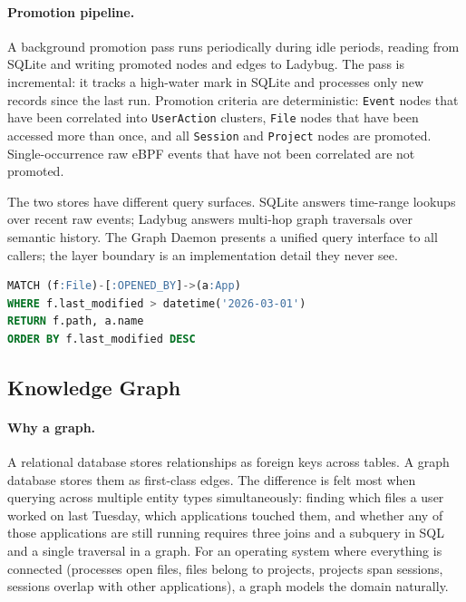 \paragraph{Promotion pipeline.}
A background promotion pass runs periodically during idle periods, reading
from SQLite and writing promoted nodes and edges to Ladybug. The pass is
incremental: it tracks a high-water mark in SQLite and processes only new
records since the last run. Promotion criteria are deterministic: \texttt{Event}
nodes that have been correlated into \texttt{UserAction} clusters, \texttt{File}
nodes that have been accessed more than once, and all \texttt{Session} and
\texttt{Project} nodes are promoted. Single-occurrence raw eBPF events that
have not been correlated are not promoted.

The two stores have different query surfaces. SQLite answers time-range
lookups over recent raw events; Ladybug answers multi-hop graph traversals over
semantic history. The Graph Daemon presents a unified query interface to all
callers; the layer boundary is an implementation detail they never see.

\begin{lstlisting}[language=SQL, caption={Example Cypher query against Ladybug: files accessed last Tuesday}]
MATCH (f:File)-[:OPENED_BY]->(a:App)
WHERE f.last_modified > datetime('2026-03-01')
RETURN f.path, a.name
ORDER BY f.last_modified DESC
\end{lstlisting}

\subsection{Knowledge Graph}
\label{sec:knowledge-graph}

\paragraph{Why a graph.}
A relational database stores relationships as foreign keys across tables. A
graph database stores them as first-class edges. The difference is felt most
when querying across multiple entity types simultaneously: finding which files
a user worked on last Tuesday, which applications touched them, and whether any
of those applications are still running requires three joins and a subquery in
SQL and a single traversal in a graph. For an operating system where
everything is connected (processes open files, files belong to projects,
projects span sessions, sessions overlap with other applications), a graph
models the domain naturally.

